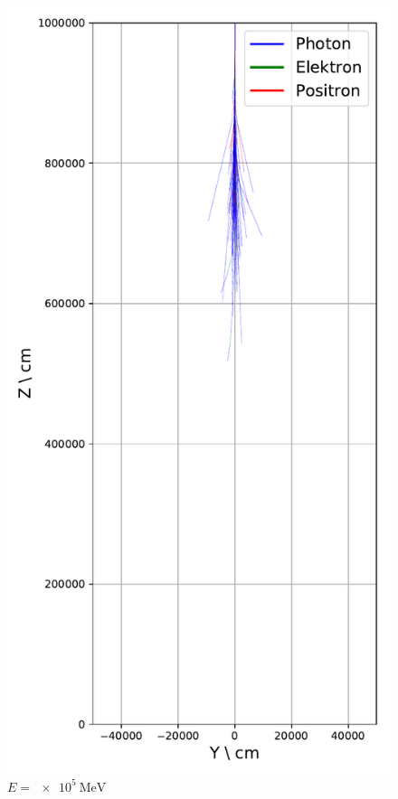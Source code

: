 \documentclass[aspectratio=1610, captions=tableheading, 11pt]{beamer}
\begin{document}
\begin{frame}
   \vspace{-5mm}
  \begin{columns}
    \begin{column}{0.33\textwidth}
      \begin{figure}
          \centering
          \includegraphics[height=0.9\textheight]{shower_presentation/2d_shower_1e5.png}
          \caption*{$E = \SI{e5}{\mega\electronvolt}$}
      \end{figure}
    \end{column}



\end{columns}
\end{frame}
\end{document}
